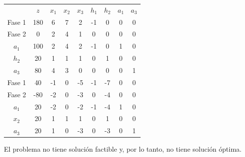 \begin{enumerate}
\begin{center}
\begin{tabular}{c|c|ccccccc|}
 & $z$ & $x_1$ & $x_2$ & $x_3$ & $h_1$ & $h_2$ & $a_1$ & $a_3$\\ 
Fase 1 & 180 & 6 & 7 & 2 & -1 & 0 & 0 & 0 \\ 
Fase 2 & 0 & 2 & 4 & 1 & 0 & 0 & 0 & 0 \\ 
\hline
$a_1$ & 100  & 2 & 4 & 2 & -1 & 0 & 1 & 0\\ 
$h_2$ & 20  & 1 & 1 & 1 & 0 & 1 & 0 & 0\\ 
$a_3$ & 80  & 4 & 3 & 0 & 0 & 0 & 0 & 1\\ 
\hline
Fase 1 & 40 & -1 & 0 & -5 & -1 & -7 & 0 & 0 \\ 
Fase 2 & -80 & -2 & 0 & -3 & 0 & -4 & 0 & 0 \\ 
\hline
$a_1$ & 20  & -2 & 0 & -2 & -1 & -4 & 1 & 0\\ 
$x_2$ & 20  & 1 & 1 & 1 & 0 & 1 & 0 & 0\\ 
$a_3$ & 20  & 1 & 0 & -3 & 0 & -3 & 0 & 1\\ 
\hline
\end{tabular}
\end{center}

El problema no tiene solución factible y, por lo tanto, no tiene solución óptima.

\end{enumerate}

